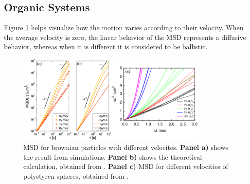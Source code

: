 \subsection{Organic Systems}

Figure \ref{fig:msddifferentvelocities} helps visualize how  the motion varies according to their velocity. When the average velocity is zero, the linear behavior of the MSD represents a diffusive behavior, whereas when it is different it is considered to be ballistic. 

\begin{figure}[h]
  \begin{center}
    \includegraphics[width=0.85\textwidth]{figures/msdmicroscopicagents.pdf}
  \end{center}
  \caption[MSD for brownian particles]{MSD for brownian particles with different velocites. \textbf{Panel a)} shows the result from simulations. \textbf{Panel b)} shows the theoretical calculation, obtained from \cite{volpe2014simulation}. \textbf{Panel c)} MSD for different velocities of polystyren spheres, obtained from \cite{howse2007self}.}\label{fig:msddifferentvelocities}
\end{figure}


